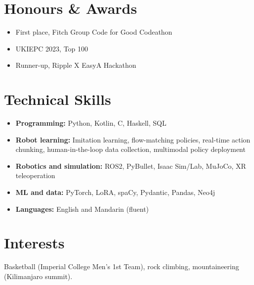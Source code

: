 \documentclass[a4paper,10pt]{article}
\begin{document}
\section*{Honours \& Awards}
\begin{itemize}
\item First place, Fitch Group Code for Good Codeathon
\item UKIEPC 2023, Top 100
\item Runner-up, Ripple X EasyA Hackathon
\end{itemize}

\section*{Technical Skills}
\begin{itemize}
\item \textbf{Programming:} Python, Kotlin, C, Haskell, SQL
\item \textbf{Robot learning:} Imitation learning, flow-matching policies, real-time action chunking, human-in-the-loop data collection, multimodal policy deployment
\item \textbf{Robotics and simulation:} ROS2, PyBullet, Isaac Sim/Lab, MuJoCo, XR teleoperation
\item \textbf{ML and data:} PyTorch, LoRA, spaCy, Pydantic, Pandas, Neo4j
\item \textbf{Languages:} English and Mandarin (fluent)
\end{itemize}

\section*{Interests}
Basketball (Imperial College Men's 1st Team), rock climbing, mountaineering (Kilimanjaro summit).
\end{document}
